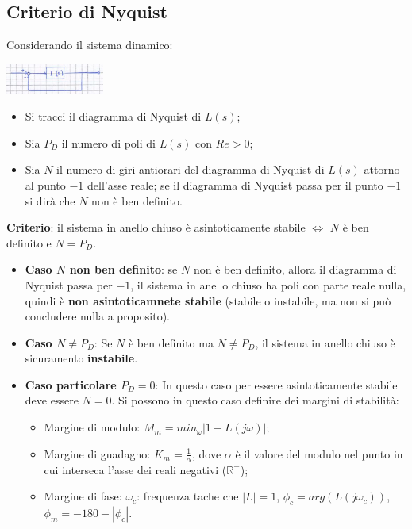     \subsection{Criterio di Nyquist}
    Considerando il sistema dinamico:
    \begin{center}
        \includegraphics[height=1cm]{../formulario/img1.JPG}
    \end{center}
    \begin{itemize}
        \item Si tracci il diagramma di Nyquist di $L(s)$;
        \item Sia $P_D$ il numero di poli di $L(s)$ con $Re > 0$;
        \item Sia $N$ il numero di giri antiorari del diagramma di Nyquist di $L(s)$ attorno al punto $-1$ dell'asse reale; se il diagramma di Nyquist passa per il punto $-1$ si dirà che $N$ non è ben definito.
    \end{itemize}
    \textbf{Criterio}: il sistema in anello chiuso è asintoticamente stabile $\Leftrightarrow$ $N$ è ben definito e $N = P_D$.\newline
    \begin{itemize}
        \item \textbf{Caso $N$ non ben definito}:\newline
        se $N$ non è ben definito, allora il diagramma di Nyquist passa per $-1$, il sistema in anello chiuso ha poli con parte reale nulla, quindi è \textbf{non asintoticamnete stabile} (stabile o instabile, ma non si può concludere nulla a proposito).\newline
        \item \textbf{Caso $N \neq P_D$}:\newline
        Se $N$ è ben definito ma $N\neq P_D$, il sistema in anello chiuso è sicuramento \textbf{instabile}.\newline
        \item \textbf{Caso particolare $P_D = 0$}:\newline
        In questo caso per essere asintoticamente stabile deve essere $N = 0$. Si possono in questo caso definire dei margini di stabilità:
        \begin{itemize}
            \item Margine di modulo: $M_m = min_{\omega} | 1 + L(j \omega)|$;
            \item Margine di guadagno: $K_m = \frac{1}{\alpha}$, dove $\alpha$ è il valore del modulo nel punto in cui interseca l'asse dei reali negativi ($\mathbb{R}^{-}$);
            \item Margine di fase: $\omega_c$: frequenza tache che $|L| = 1$, $\phi_c = arg(L(j \omega_c))$, $\phi_m = -180 - |\phi_c|$.
        \end{itemize}
    \end{itemize}
